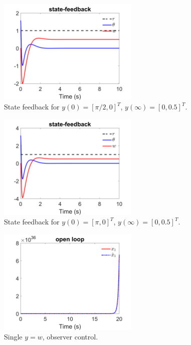 \documentclass[12pt]{article}
\numberwithin{equation}{section}
\begin{document}
\begin{figure}[!ht]
    \centering
    \includegraphics[width=0.6\textwidth]{state_feedback_2.png}
    \caption{State feedback for $y(0) = [\pi/2, 0]^T$, $y(\infty) = [0, 0.5]^T$.}
    \label{fig:7}
\end{figure}

\begin{figure}[!ht]
    \centering
    \includegraphics[width=0.6\textwidth]{state_feedback_3.png}
    \caption{State feedback for $y(0) = [\pi, 0]^T$, $y(\infty) = [0, 0.5]^T$.}
    \label{fig:8}
\end{figure}

\begin{figure}[!ht]
    \centering
    \includegraphics[width=0.6\textwidth]{single_output_observer/fig1.png}
    \caption{Single $y = w$, observer control.}
    \label{fig:observer_sim_first}
\end{figure}
\end{document}
